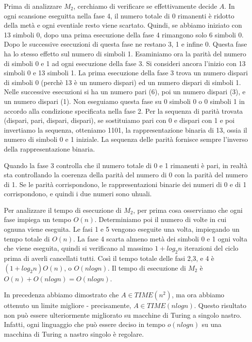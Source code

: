 \documentclass{article}
\begin{document}
Prima di analizzare $M_2$, cerchiamo di verificare se effettivamente decide $A$.
In ogni scansione eseguitta nella fase 4, il numero totale di 0 rimanenti è ridotto della metà e ogni eventiale resto viene scartato.
Quindi, se abbiamo iniziato con 13 simboli 0, dopo una prima esecuzione della fase 4 rimangono solo 6 simboli 0.
Dopo le successive esecuzioni di questa fase ne restano 3, 1 e infine 0.
Questa fase ha lo stesso effetto sul numero di simboli 1.
Esaminiamo ora la parità del numero di simboli 0 e 1 ad ogni esecuzione della fase 3.
Si consideri ancora l'inizio con 13 simboli 0 e 13 simboli 1.
La prima esecuzione della fase 3 trova un numero dispari di simboli 0 (perchè 13 è un numero dispari) ed un numero dispari di simboli 1.
Nelle successive esecuzioni si ha un numero pari (6), poi un numero dispari (3), e un numero dispari (1).
Non eseguiamo questa fase su 0 simboli 0 o 0 simboli 1 in accordo alla condizione specificata nella fase 2.
Per la sequenza di parità trovata (dispari, pari, dispari, dispari), se sostituiamo pari con 0 e dispari con 1 e poi invertiamo la sequenza, otteniamo 1101, la rappresentazione binaria di 13, ossia il numero di simboli 0 e 1 iniziale.
La sequenza delle parità fornisce sempre l'inverso della rappresentazione binaria.

Quando la fase 3 controlla che il numero totale di 0 e 1 rimanenti è pari, in realtà sta controllando la coerenza della parità del numero di 0 con la parità del numero di 1.
Se le parità corrispondono, le rappresentazioni binarie dei numeri di 0 e di 1 corrispondono, e quindi i due numeri sono uhuali.

Per analizzare il tempo di esecuzione di $M_2$, per prima cosa osserviamo che ogni fase impiega un tempo $O(n)$.
Determiniamo poi il numero di volte in cui ognuna viene eseguita.
Le fasi 1 e 5 vengono eseguite una volta, impiegando un tempo totale di $O(n)$.
La fase 4 scarta almeno metà dei simboli 0 e 1 ogni volta che viene eseguita, quindi si verificano al massimo $1 + log_2 n$ iterazioni del ciclo prima di averli cancellati tutti.
Così il tempo totale delle fasi 2,3, e 4 è $(1 + log_2 n)O(n)$, o $O(nlogn)$. Il tempo di esecuzione di $M_2$ è $O(n) + O(nlogn) = O(nlogn)$.

In precedenza abbiamo dimostrato che $A \in TIME(n^2)$, ma ora abbiamo ottenuto un limite migliore - precisamente, $A \in TIME(nlogn)$.
Questo risultato non può essere ulteriormente migliorato su macchine di Turing a singolo nastro.
Infatti, ogni linguaggio che può essere deciso in tempo $o(nlogn)$ su una macchina di Turing a nastro singolo è regolare.
\end{document}

